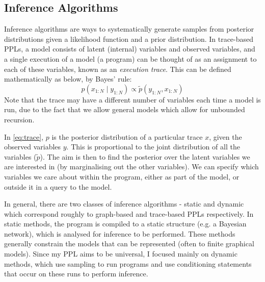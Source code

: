 \documentclass[sigconf]{acmart}
\begin{document}
\subsection{Inference Algorithms}


Inference algorithms are ways to systematically generate samples from posterior distributions given a likelihood function and a prior distribution. In trace-based PPLs, a model consists of latent (internal) variables and observed variables, and a single execution of a model (a program) can be thought of as an assignment to each of these variables, known as an \textit{execution trace}. This can be defined mathematically as below, by Bayes' rule:
%
\begin{equation} \label{eq:trace}
  p(x_{1:N}\mid y_{1:N})\propto \tilde{p}(y_{1:N},x_{1:N})
\end{equation}
%
Note that the trace may have a different number of variables each time a model is run, due to the fact that we allow general models which allow for unbounded recursion.

In \eqref{eq:trace}, $p$ is the posterior distribution of a particular trace $x$, given the observed variables $y$. This is proportional to the joint distribution of all the variables ($\tilde{p}$). The aim is then to find the posterior over the latent variables we are interested in (by marginalising out the other variables). We can specify which variables we care about within the program, either as part of the model, or outside it in a query to the model.

In general, there are two classes of inference algorithms - static and dynamic \cite{gordon2014probabilistic} which correspond roughly to graph-based and trace-based PPLs respectively. In static methods, the program is compiled to a static structure (e.g. a Bayesian network), which is analysed for inference to be performed. These methods generally constrain the models that can be represented (often to finite graphical models). Since my PPL aims to be universal, I focused mainly on dynamic methods, which use sampling to run programs and use conditioning statements that occur on these runs to perform inference.
\end{document}

